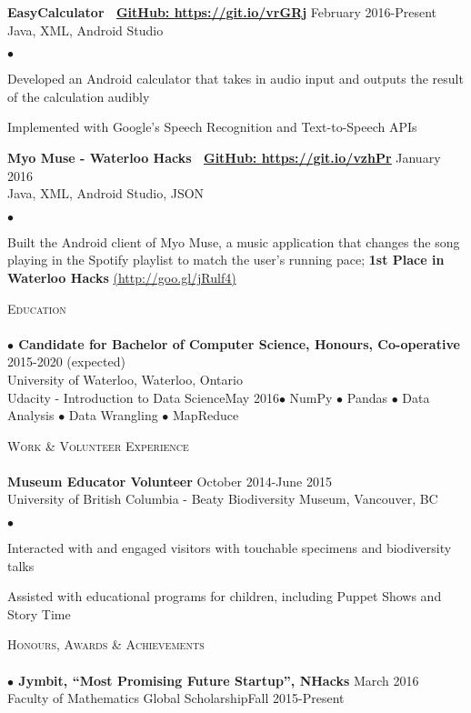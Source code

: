 \documentclass{article}
\newcommand{\lineunder}{\vspace*{-8pt} \\ \hspace*{-18pt} \hrulefill \\}
\newcommand{\header}[1]{{\hspace*{-15pt}\vspace*{6pt} \textsc{#1}} \vspace*{-6pt} \lineunder}
\newcommand{\employer}[3]{{ \textbf{#1} \hfill #2\\ {#3}\\  }}
\newenvironment{achievements}{\begin{list}{$\bullet$}{\topsep 0pt \itemsep -2pt}}{\vspace*{4pt}\end{list}}
\newcommand{\schoolwithcourses}[4]{
 \hspace{12pt} \textbf{$\bullet$ \hspace{2bp}#1} \hfill{#2}\\ \hspace{25pt}#3\\ 
\vspace*{5pt}
}
\newcommand{\award}[3]{\hspace{12pt} \textbf{$\bullet$ \hspace{2bp}#1} \hfill{#2} \\ \vspace{2pt}
}
\begin{document}
\employer{EasyCalculator \hspace{5pt} \Mundus~\href{https://git.io/vrGRj}{GitHub: \underline{https://git.io/vrGRj}}}{February 2016-Present}{Java, XML, Android Studio}
	\begin{achievements}
	\item Developed an Android calculator that takes in audio input and outputs the result of the calculation audibly
	\item Implemented with Google's Speech Recognition and Text-to-Speech APIs
	\end{achievements}

\employer{Myo Muse - Waterloo Hacks \hspace{5pt} \Mundus~\href{https://git.io/vzhPr}{GitHub: \underline{https://git.io/vzhPr}}}{January 2016}{Java, XML, Android Studio, JSON}
	\begin{achievements}
	\item Built the Android client of Myo Muse, a music application that changes the song playing in the Spotify playlist to match the user's running pace; \textbf{1st Place in Waterloo Hacks} \href{http://goo.gl/jRulf4}{(\underline{http://goo.gl/jRulf4})}
	\end{achievements}

\header{Education}

\schoolwithcourses{Candidate for Bachelor of Computer Science, Honours, Co-operative}{2015-2020 (expected)}{University of Waterloo, Waterloo, Ontario}

\schoolwithcourses{Udacity - Introduction to Data Science}{May 2016}{$\bullet$ NumPy $\bullet$ Pandas $\bullet$ Data Analysis $\bullet$ Data Wrangling $\bullet$ MapReduce}

\header{Work \& Volunteer Experience}
\employer{Museum Educator Volunteer}{October 2014-June 2015}{University of British Columbia - Beaty Biodiversity Museum, Vancouver, BC}
	\begin{achievements}
	\item Interacted with and engaged visitors with touchable specimens and biodiversity talks
	\item Assisted with educational programs for children, including Puppet Shows and Story Time 
	\end{achievements}

\header{Honours, Awards \& Achievements}

\award {Jymbit, ``Most Promising Future Startup'', NHacks}{March 2016}

\award {Faculty of Mathematics Global Scholarship}{Fall 2015-Present}
\end{document}
